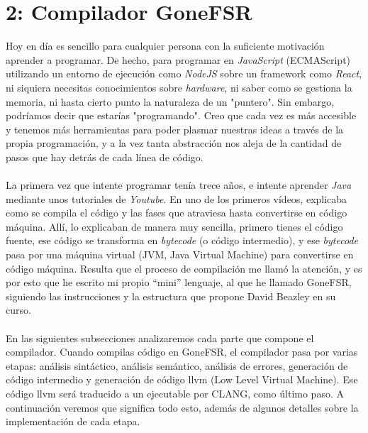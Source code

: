 \section*{2: Compilador GoneFSR}
Hoy en día es sencillo para cualquier persona con la suficiente motivación aprender a programar. De hecho, para programar en \textit{JavaScript} (ECMAScript) utilizando un entorno de ejecución como \textit{NodeJS} sobre un framework como \textit{React}, ni siquiera necesitas conocimientos sobre \textit{hardware}, ni saber como se gestiona la memoria, ni hasta cierto punto la naturaleza de un "puntero". Sin embargo, podríamos decir que estarías "programando". Creo que cada vez es más accesible y tenemos más herramientas para poder plasmar nuestras ideas a través de la propia programación, y a la vez tanta abstracción nos aleja de la cantidad de pasos que hay detrás de cada línea de código.\\\\
La primera vez que intente programar tenía trece años, e intente aprender \textit{Java} mediante unos tutoriales de \textit{Youtube}. En uno de los primeros vídeos, explicaba como se compila el código y las fases que atraviesa hasta convertirse en código máquina. Allí, lo explicaban de manera muy sencilla, primero tienes el código fuente, ese código se transforma en \textit{bytecode} (o código intermedio), y ese \textit{bytecode} pasa por una máquina virtual (JVM, Java Virtual Machine) para convertirse en código máquina. Resulta que el proceso de compilación me llamó la atención, y es por esto que he escrito mi propio ``mini''  lenguaje, al que he llamado GoneFSR, siguiendo las instrucciones y la estructura que propone David Beazley en su curso.\\\\
En las siguientes subsecciones analizaremos cada parte que compone el compilador. Cuando compilas código en GoneFSR, el compilador pasa por varias etapas: análisis sintáctico, análisis semántico, análisis de errores, generación de código intermedio y generación de código llvm (Low Level Virtual Machine). Ese código llvm será traducido a un ejecutable por CLANG, como último paso. A continuación veremos que significa todo esto, además de algunos detalles sobre la implementación de cada etapa.
